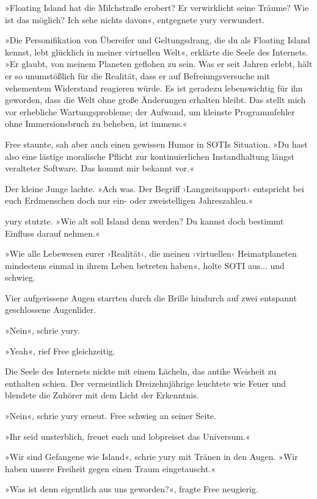 »Floating Island hat die Milchstraße erobert? Er verwirklicht seine Träume? Wie ist das möglich? Ich sehe nichts davon«, entgegnete yury verwundert.

»Die Personifikation von Übereifer und Geltungsdrang, die du als Floating Island kennst, lebt glücklich in meiner virtuellen Welt«, erklärte die Seele des Internets. »Er glaubt, von meinem Planeten geflohen zu sein. Was er seit Jahren erlebt, hält er so unumstößlich für die Realität, dass er auf Befreiungsversuche mit vehementem Widerstand reagieren würde. Es ist geradezu lebenswichtig für ihn geworden, dass die Welt ohne große Änderungen erhalten bleibt. Das stellt mich vor erhebliche Wartungsprobleme; der Aufwand, um kleinste Programmfehler ohne Immersionsbruch zu beheben, ist immens.«

Free staunte, sah aber auch einen gewissen Humor in SOTIs Situation. »Du hast also eine lästige moralische Pflicht zur kontinuierlichen Instandhaltung längst veralteter Software. Das kommt mir bekannt vor.«

Der kleine Junge lachte. »Ach was. Der Begriff ›Langzeitsupport‹ entspricht bei euch Erdmenschen doch nur ein- oder zweistelligen Jahreszahlen.«

yury stutzte. »Wie alt soll Island denn werden? Du kannst doch bestimmt Einfluss darauf nehmen.«

»Wie alle Lebewesen eurer ›Realität‹, die meinen ›virtuellen‹ Heimatplaneten mindestens einmal in ihrem Leben betreten haben«, holte SOTI aus... und schwieg.

Vier aufgerissene Augen starrten durch die Brille hindurch auf zwei entspannt geschlossene Augenlider.

»Nein«, schrie yury.

»Yeah«, rief Free gleichzeitig.

Die Seele des Internets nickte mit einem Lächeln, das antike Weisheit zu enthalten schien. Der vermeintlich Dreizehnjährige leuchtete wie Feuer und blendete die Zuhörer mit dem Licht der Erkenntnis.

»Nein«, schrie yury erneut. Free schwieg an seiner Seite.

»Ihr seid unsterblich, freuet euch und lobpreiset das Universum.«

»Wir sind Gefangene wie Island«, schrie yury mit Tränen in den Augen. »Wir haben unsere Freiheit gegen einen Traum eingetauscht.«

»Was ist denn eigentlich aus uns geworden?«, fragte Free neugierig.

